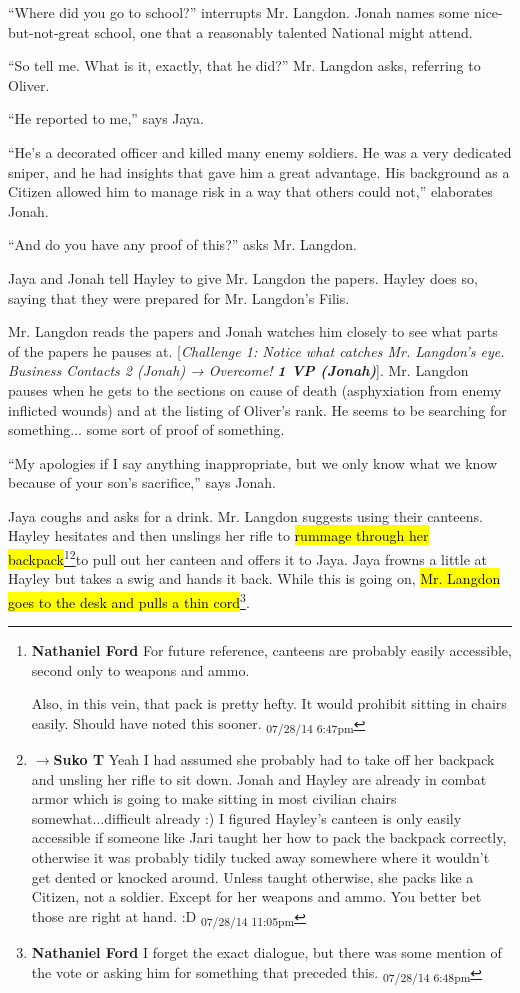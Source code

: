 ``Where did you go to school?'' interrupts Mr. Langdon.  Jonah names some nice-but-not-great school, one that a reasonably talented National might attend.

``So tell me.  What is it, exactly, that he did?'' Mr. Langdon asks, referring to Oliver.

``He reported to me,'' says Jaya.

``He's a decorated officer and killed many enemy soldiers.  He was a very dedicated sniper, and he had insights that gave him a great advantage. His background as a Citizen allowed him to manage risk in a way that others could not,'' elaborates Jonah.

``And do you have any proof of this?'' asks Mr. Langdon.

Jaya and Jonah tell Hayley to give Mr. Langdon the papers.  Hayley does so, saying that they were prepared for Mr. Langdon's Filis.

Mr. Langdon reads the papers and Jonah watches him closely to see what parts of the papers he pauses at.  {[}\textit{Challenge 1:  Notice what catches Mr. Langdon's eye. Business Contacts 2 (Jonah) → Overcome! }\textit{\textbf{1 VP (Jonah)}}{]}.  Mr. Langdon pauses when he gets to the sections on cause of death (asphyxiation from enemy inflicted wounds) and at the listing of Oliver's rank.  He seems to be searching for something... some sort of proof of something.

``My apologies if I say anything inappropriate, but we only know what we know because of your son's sacrifice,'' says Jonah.

Jaya coughs and asks for a drink.  Mr. Langdon suggests using their canteens.  Hayley hesitates and then unslings her rifle to \hl{rummage through her backpack}\footnote{\textbf{Nathaniel Ford }For future reference, canteens are probably easily accessible, second only to weapons and ammo.

Also, in this vein, that pack is pretty hefty. It would prohibit sitting in chairs easily. Should have noted this sooner. \textsubscript{07/28/14 6:47pm}}\footnote{$\rightarrow$\textbf{Suko T }Yeah I had assumed she probably had to take off her backpack and unsling her rifle to sit down.  Jonah and Hayley are already in combat armor which is going to make sitting in most civilian chairs somewhat...difficult already :)  I figured Hayley's canteen is only easily accessible if someone like Jari taught her how to pack the backpack correctly, otherwise it was probably tidily tucked away somewhere where it wouldn't get dented or knocked around.  Unless taught otherwise, she packs like a Citizen, not a soldier.  Except for her weapons and ammo.  You better bet those are right at hand. :D \textsubscript{07/28/14 11:05pm}}to pull out her canteen and offers it to Jaya.  Jaya frowns a little at Hayley but takes a swig and hands it back.  While this is going on, \hl{Mr. Langdon goes to the desk and pulls a thin cord}\footnote{\textbf{Nathaniel Ford }I forget the exact dialogue, but there was some mention of the vote or asking him for something that preceded this. \textsubscript{07/28/14 6:48pm}}.

